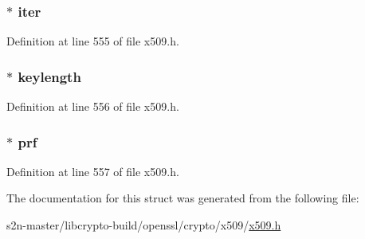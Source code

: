 \subsubsection[{\texorpdfstring{iter}{iter}}]{ $\ast$ iter}\hypertarget{struct_p_b_k_d_f2_p_a_r_a_m__st_ab7b90cf95e75c0cd6742cfe1aad7dd03}{}\label{struct_p_b_k_d_f2_p_a_r_a_m__st_ab7b90cf95e75c0cd6742cfe1aad7dd03}


Definition at line 555 of file x509.\+h.

\subsubsection[{\texorpdfstring{keylength}{keylength}}]{ $\ast$ keylength}\hypertarget{struct_p_b_k_d_f2_p_a_r_a_m__st_aff4b79f890e22248c3e9ef710be259f1}{}\label{struct_p_b_k_d_f2_p_a_r_a_m__st_aff4b79f890e22248c3e9ef710be259f1}


Definition at line 556 of file x509.\+h.

\subsubsection[{\texorpdfstring{prf}{prf}}]{ $\ast$ prf}\hypertarget{struct_p_b_k_d_f2_p_a_r_a_m__st_a4b555f5e1c3039f5bfaa1b3366b45f98}{}\label{struct_p_b_k_d_f2_p_a_r_a_m__st_a4b555f5e1c3039f5bfaa1b3366b45f98}


Definition at line 557 of file x509.\+h.



The documentation for this struct was generated from the following file\+:\begin{DoxyCompactItemize}
\item 
s2n-\/master/libcrypto-\/build/openssl/crypto/x509/\hyperlink{crypto_2x509_2x509_8h}{x509.\+h}\end{DoxyCompactItemize}

